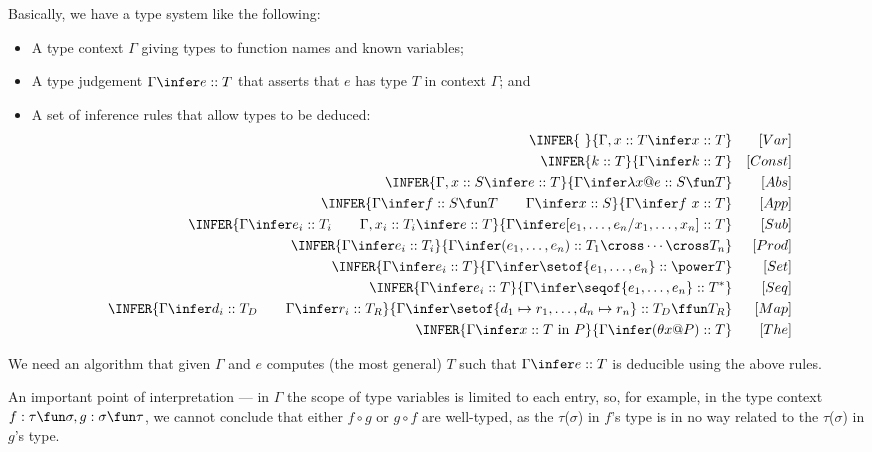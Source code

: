 Basically, we have a type system like the following:
\begin{itemize}
  \item
     A type context $\Gamma$
     giving types to function names and known variables;
  \item
    A type judgement $\Gamma \infer e :: T$ that asserts
    that $e$ has type $T$ in context $\Gamma$; and
  \item
    A set of inference rules that allow types to be deduced:
    \begin{eqnarray*}
       \INFER%
         {~}
         {\Gamma,x::T \infer x :: T}
         && [Var]
    \\ \INFER%
         {k :: T}
         {\Gamma \infer k :: T}
         && [Const]
    \\ \INFER%
         {\Gamma,x::S \infer e::T}
         {\Gamma \infer \lambda x @ e :: S \fun T}
         && [Abs]
    \\ \INFER%
         {\Gamma \infer f :: S \fun T \qquad \Gamma \infer x :: S}
         {\Gamma \infer f~x :: T}
         && [App]
    \\ \INFER%
         {\Gamma \infer e_i :: T_i \qquad \Gamma,x_i::T_i \infer e::T}
         {\Gamma \infer e[e_1,\ldots,e_n/x_1,\ldots,x_n] :: T}
         && [Sub]
    \\ \INFER%
         {\Gamma \infer e_i :: T_i}
         {\Gamma \infer (e_1,\ldots,e_n) :: T_1 \cross \cdots \cross T_n}
         && [Prod]
    \\ \INFER%
         {\Gamma \infer e_i :: T}
         {\Gamma \infer \setof{e_1,\ldots,e_n} :: \power T}
         && [Set]
    \\ \INFER%
         {\Gamma \infer e_i :: T}
         {\Gamma \infer \seqof{e_1,\ldots,e_n} :: T^*}
         && [Seq]
    \\ \INFER%
         {\Gamma \infer d_i :: T_D \qquad \Gamma \infer r_i :: T_R}
         {\Gamma \infer \setof{d_1 \mapsto r_1,\ldots,d_n \mapsto r_n} :: T_D \ffun T_R}
         && [Map]
    \\ \INFER%
         {\Gamma \infer x :: T \mbox{ in }  P }
         {\Gamma \infer (\theta x @ P) :: T}
         && [The]
    \end{eqnarray*}
\end{itemize}
We need an algorithm that given $\Gamma$ and $e$ computes (the most general) $T$
such that $\Gamma \infer e :: T$ is deducible using the above rules.

An important point of interpretation --- in $\Gamma$
the scope of type variables is limited to each entry,
so, for example, in the type context  $f:\tau \fun \sigma, g:\sigma \fun \tau$,
we cannot conclude that either $f \circ g$ or $g \circ f$ are well-typed,
as the $\tau$($\sigma$) in $f$'s type is in no way related to the $\tau$($\sigma$)
in $g$'s type.
